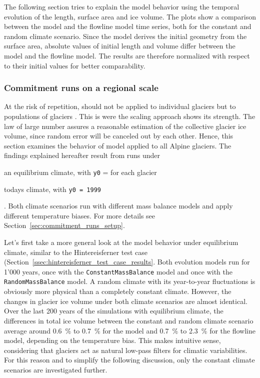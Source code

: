       The following section tries to explain the model behavior using the temporal evolution of the length, surface area and ice volume. The plots show a comparison between the \vas{} model and the flowline model time series, both for the constant and random climate scenario. Since the \vas{} model derives the initial geometry from the surface area, absolute values of initial length and volume differ between the \vas{} model and the flowline model. The results are therefore normalized with respect to their initial values for better comparability. %

      \subsubsection{Commitment runs on a regional scale} %
      \label{ssec:commitment_runs_results}

        At the risk of repetition, \vas{} should not be applied to individual glaciers but to populations of glaciers \citep{Bahr2015}. This is were the scaling approach shows its strength. The law of large number assures a reasonable estimation of the collective glacier ice volume, since random error will be canceled out by each other. Hence, this section examines the behavior of \vas{} model applied to all Alpine glaciers. The findings explained hereafter result from runs under
        \begin{enumerate*}[label=(\alph*)]
          \item an equilibrium climate, with \lstinline`y0` = \tstar{} for each glacier
          \item todays climate, with \lstinline`y0 = 1999`
        \end{enumerate*}.
        Both climate scenarios run with different mass balance models and apply different temperature biases. For more details see Section~\ref{sec:commitment_runs_setup}.

        Let's first take a more general look at the model behavior under equilibrium climate, similar to the Hintereisferner test case (Section~\ref{ssec:hintereisferner_test_case_results}. Both evolution models run for 1'000 years, once with the \lstinline`ConstantMassBalance` model and once with the \lstinline`RandomMassBalance` model. A random climate with its year-to-year fluctuations is obviously more physical than a completely constant climate. However, the changes in glacier ice volume under both climate scenarios are almost identical. Over the last 200 years of the simulations with equilibrium climate, the differences in total ice volume between the constant and random climate scenario average around \SI{0.6}{\percent} to \SI{0.7}{\percent} for the \vas{} model and \SI{0.7}{\percent} to \SI{2.3}{\percent} for the flowline model, depending on the temperature bias. This makes intuitive sense, considering that glaciers act as natural low-pass filters for climatic variabilities. For this reason and to simplify the following discussion, only the constant climate scenarios are investigated further.

